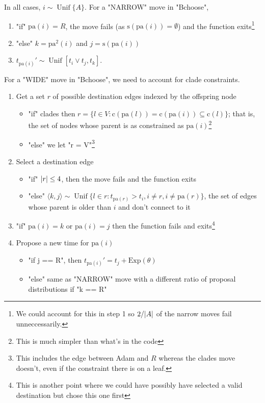 \documentclass[11pt,a4paper]{article}
\newcommand{\edge}[2]{\langle#1, #2\rangle}
\newcommand{\pa}{\mathrm{pa}}
\newcommand{\sib}{\mathrm{s}}
\newcommand{\cla}{\mathrm{c}}
\newcommand{\Exp}[1]{\mathrm{Exp}(#1)}
\DeclarePairedDelimiter\abs{\lvert}{\rvert}%
\DeclareMathOperator*{\Unif}{\mathrm{Unif}}
\begin{document}
In all cases, $ i \sim \Unif\{A\} $. For a "NARROW" move in "Bchoose",
\begin{enumerate}
    \item "if" $ \pa(i) = R $, the move fails (as $ \sib(\pa(i)) = \emptyset $) and the function exits\footnote{We could account for this in step 1 so $ 2 / \abs{A} $ of the narrow moves fail unneccessarily.}
    \item "else" $ k = \pa^2(i) $ and $ j = \sib(\pa(i)) $
    \item $ t_{\pa(i)}' \sim \Unif[t_i \vee t_j, t_k] $.
\end{enumerate}
For a "WIDE" move in "Bchoose", we need to account for clade constraints.
\begin{enumerate}
    \item Get a set $ r $ of possible destination edges indexed by the offspring node
    \begin{itemize}
        \item "if" clades then $ r = \{l \in V: \cla(\pa(l)) = \cla(\pa(i)) \subseteq \cla(l)\} $; that is, the set of nodes whose parent is as constrained as $ \pa(i) $\footnote{This is much simpler than what's in the code}
        \item "else" we let "r = V"\footnote{This includes the edge between Adam and $ R $ whereas the clades move doesn't, even if the constraint there is on a leaf.}
    \end{itemize}
    \item Select a destination edge
    \begin{itemize}
        \item "if" $ \abs{r} \leq 4 $, then the move fails and the function exits
        \item "else" $ \edge{k}{j} \sim \Unif\{l \in r : t_{\pa(r)} > t_i, i \neq r, i \neq \pa(r)\} $, the set of edges whose parent is older than $ i $ and don't connect to it
    \end{itemize}
    \item "if" $ \pa(i) = k $ or $ \pa(i) = j $ then the function fails and exits\footnote{This is another point where we could have possibly have selected a valid destination but chose this one first}
    \item Propose a new time for $ \pa(i) $
    \begin{itemize}
        \item "if j == R", then $ t_{\pa(i)}' = t_j + \Exp{\theta} $
        \item "else" same as "NARROW" move with a different ratio of proposal distributions if "k == R"
    \end{itemize}
\end{enumerate}
\end{document}
